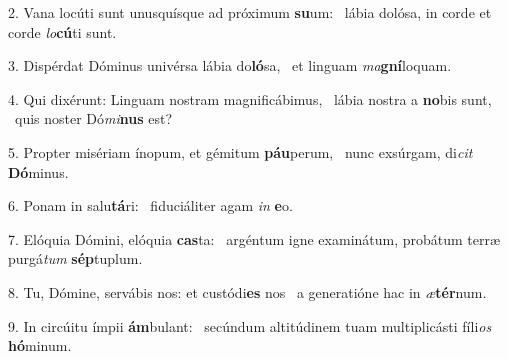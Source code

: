 2. Vana locúti sunt unusquísque ad próximum \textbf{su}um: \ast\  lábia dolósa, in corde et corde \textit{lo}\textbf{cú}ti sunt.\

3. Dispérdat Dóminus univérsa lábia do\textbf{ló}sa, \ast\  et linguam \textit{ma}\textbf{gní}loquam.\

4. Qui dixérunt: Linguam nostram magnificábimus, \dag\  lábia nostra a \textbf{no}bis sunt, \ast\  quis noster Dó\textit{mi}\textbf{nus} est?\

5. Propter misériam ínopum, et gémitum \textbf{páu}perum, \ast\  nunc exsúrgam, di\textit{cit} \textbf{Dó}minus.\

6. Ponam in salu\textbf{tá}ri: \ast\  fiduciáliter agam \textit{in} \textbf{e}o.\

7. Elóquia Dómini, elóquia \textbf{cas}ta: \ast\  argéntum igne examinátum, probátum terræ purgá\textit{tum} \textbf{sép}tuplum.\

8. Tu, Dómine, servábis nos: et custódi\textbf{es} nos \ast\  a generatióne hac in \textit{æ}\textbf{tér}num.\

9. In circúitu ímpii \textbf{ám}bulant: \ast\  secúndum altitúdinem tuam multiplicásti fíli\textit{os} \textbf{hó}minum.\

